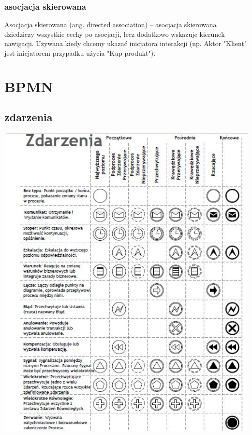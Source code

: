 \documentclass[11pt]{article}
\begin{document}
\subsubsection{asocjacja skierowana}
\label{sec:orgd9bf6fe}
Asocjacja skierowana (ang. directed association) – asocjacja skierowana dziedziczy wszystkie cechy po asocjacji, lecz dodatkowo wskazuje kierunek nawigacji. Używana kiedy chcemy ukazać inicjatora interakcji (np. Aktor "Klient" jest inicjatorem przypadku użycia "Kup produkt").
\section{BPMN}
\label{sec:orgfcb42c3}
\subsection{zdarzenia}
\label{sec:orgf4e4d7a}
\begin{center}
\includegraphics[width=.9\linewidth]{./zdarzenia.png}
\end{center}
\end{document}
